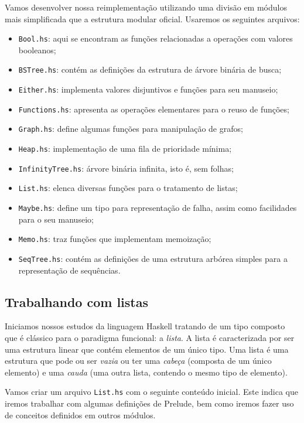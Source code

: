 \documentclass[a4paper]{article}
\begin{document}
Vamos desenvolver nossa reimplementação utilizando uma divisão em módulos mais simplificada que a estrutura modular oficial.
Usaremos os seguintes arquivos:
\begin{itemize}
	\item \texttt{Bool.hs}: aqui se encontram as funções relacionadas a operações com valores booleanos;
	\item \texttt{BSTree.hs}: contém as definições da estrutura de árvore binária de busca;
	\item \texttt{Either.hs}: implementa valores disjuntivos e funções para seu manuseio;
	\item \texttt{Functions.hs}: apresenta as operações elementares para o reuso de funções;
	\item \texttt{Graph.hs}: define algumas funções para manipulação de grafos;
	\item \texttt{Heap.hs}: implementação de uma fila de prioridade mínima;
	\item \texttt{InfinityTree.hs}: árvore binária infinita, isto é, sem folhas;
	\item \texttt{List.hs}: elenca diversas funções para o tratamento de listas;
	\item \texttt{Maybe.hs}: define um tipo para representação de falha, assim como facilidades para o seu manuseio;
	\item \texttt{Memo.hs}: traz funções que implementam memoização;
	\item \texttt{SeqTree.hs}: contém as definições de uma estrutura arbórea simples para a representação de sequências.
\end{itemize}

\subsection{Trabalhando com listas}

Iniciamos nossos estudos da linguagem Haskell tratando de um tipo composto que é clássico para o paradigma funcional: a \emph{lista}.
A lista é caracterizada por ser uma estrutura linear que contém elementos de um único tipo.
Uma lista é uma estrutura que pode ou ser \emph{vazia} ou ter uma \emph{cabeça} (composta de um único elemento) e uma \emph{cauda} (uma outra lista, contendo o mesmo tipo de elemento).

Vamos criar um arquivo \texttt{List.hs} com o seguinte conteúdo inicial.
Este indica que iremos trabalhar com algumas definições de Prelude, bem como iremos fazer uso de conceitos definidos em outros módulos.
\end{document}
